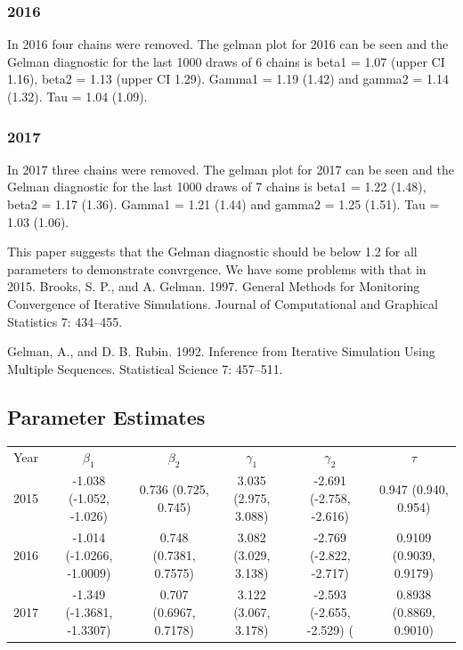 \documentclass[letterpaper,12pt]{article}\usepackage[]{graphicx}\usepackage[]{color}
\begin{document}
\subsubsection{2016}
 In 2016 four chains were removed.  The gelman plot for 2016 can be seen and the Gelman diagnostic for the last 1000 draws of 6 chains is beta1 = 1.07 (upper CI 1.16), beta2 = 1.13 (upper CI 1.29).  Gamma1 = 1.19 (1.42) and gamma2 = 1.14 (1.32).  Tau = 1.04 (1.09).  


\subsubsection{2017}
 In 2017 three chains were removed.  The gelman plot for 2017 can be seen and the Gelman diagnostic for the last 1000 draws of 7 chains is beta1 = 1.22 (1.48), beta2 = 1.17 (1.36).  Gamma1 = 1.21 (1.44) and gamma2 = 1.25 (1.51).  Tau = 1.03 (1.06).  


This paper suggests that the Gelman diagnostic should be below 1.2 for all parameters to demonstrate convrgence.  We have some problems with that in 2015.  
Brooks, S. P., and A. Gelman. 1997. General Methods for Monitoring Convergence of Iterative Simulations. Journal of Computational and Graphical Statistics 7: 434–455.

Gelman, A., and D. B. Rubin. 1992. Inference from Iterative Simulation Using Multiple Sequences. Statistical Science 7: 457–511.

\subsection{Parameter Estimates}

{\tiny
\begin{center}
\begin{tabular}{cccccc}
Year & $\beta_1$  & $\beta_2$ & $\gamma_1$ & $\gamma_2$ & $\tau$\\ 
2015 & -1.038 (-1.052, -1.026) & 0.736 (0.725, 0.745) & 3.035 (2.975, 3.088) & -2.691 (-2.758, -2.616) & 0.947 (0.940, 0.954) \\ 
2016 & -1.014 (-1.0266, -1.0009) & 0.748 (0.7381, 0.7575) &3.082 (3.029, 3.138)& -2.769 (-2.822, -2.717) & 0.9109 (0.9039, 0.9179)\\ 
2017 & -1.349 (-1.3681, -1.3307) & 0.707 (0.6967, 0.7178)& 3.122 (3.067, 3.178) & -2.593 (-2.655, -2.529) (& 0.8938 (0.8869, 0.9010)\\
\end{tabular}
\end{center}
}
\end{document}
